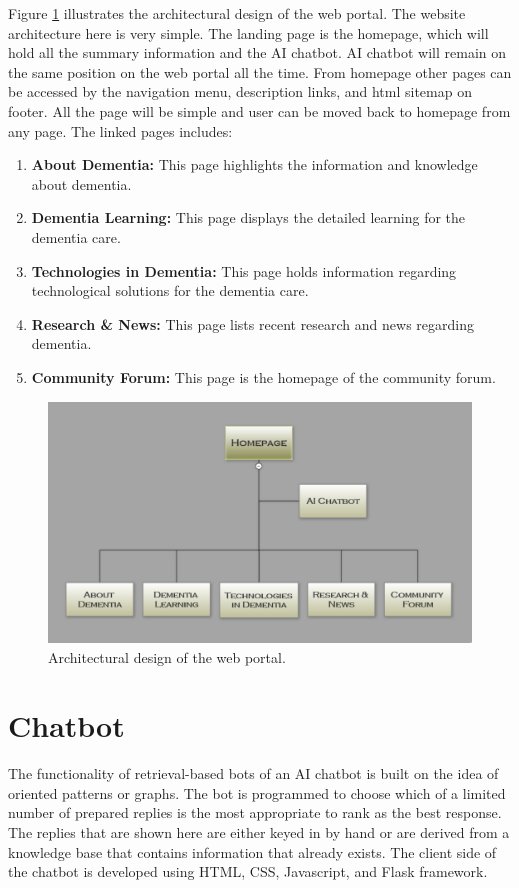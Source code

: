Figure \ref{fig:4} illustrates the architectural design of the web portal. The website architecture here is very simple. The landing page is the homepage, which will hold all the summary information and the AI chatbot. AI chatbot will remain on the same position on the web portal all the time. From homepage other pages can be accessed by the navigation menu, description links, and html sitemap on footer. All the page will be simple and user can be moved back to homepage from any page. The linked pages includes:
\begin{enumerate}[label=\arabic*.]
	\item \textbf{About Dementia:} This page highlights the information and knowledge about dementia.
	\item \textbf{Dementia Learning:} This page displays the detailed learning for the dementia care.
	\item \textbf{Technologies in Dementia:} This page holds information regarding technological solutions for the dementia care.
	\item \textbf{Research \& News:} This page lists recent research and news regarding dementia.
	\item \textbf{Community Forum:} This page is the homepage of the community forum.
\end{enumerate}

\begin{figure}[!h]
	\centering
	\includegraphics[width=\linewidth]{arch_design}
	\caption{Architectural design of the web portal.}
	\label{fig:4}
\end{figure}

\section{Chatbot}
The functionality of retrieval-based bots of an AI chatbot is built on the idea of oriented patterns or graphs. The bot is programmed to choose which of a limited number of prepared replies is the most appropriate to rank as the best response. The replies that are shown here are either keyed in by hand or are derived from a knowledge base that contains information that already exists. The client side of the chatbot is developed using HTML, CSS, Javascript, and Flask framework.

